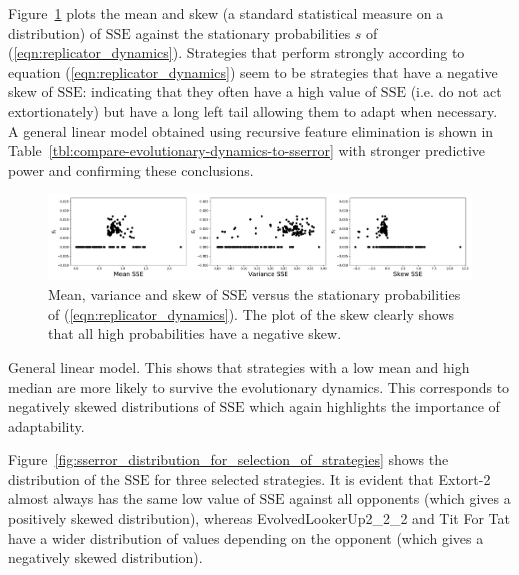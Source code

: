 \documentclass[a4paper]{article}
\newcommand{\SSe}{\text{SSE}}
\begin{document}
Figure~\ref{fig:compare-evolutionary-dynamics-to-sserror} plots the mean and
skew (a standard statistical measure on a distribution) of \(\SSe\) against the
stationary probabilities \(s\) of (\ref{eqn:replicator_dynamics}). Strategies
that perform strongly according to equation (\ref{eqn:replicator_dynamics}) seem
to be strategies that have a negative skew of \(\SSe\): indicating that they
often have a high value of \(\SSe\) (i.e. do not act extortionately) but have a
long left tail allowing them to adapt when necessary. A general linear model
obtained using recursive feature elimination is shown in
Table~\ref{tbl:compare-evolutionary-dynamics-to-sserror} with stronger
predictive power and confirming these conclusions.

\begin{figure}[!hbtp]
    \centering
    \includegraphics[width=\textwidth]{./assets/img/compare-evolutionary-dynamics-to-sserror/main.pdf}
    \caption{Mean, variance and skew of \(\SSe\) versus the stationary
    probabilities of (\ref{eqn:replicator_dynamics}). The plot of the skew
    clearly shows that all high probabilities have a negative skew.}
    \label{fig:compare-evolutionary-dynamics-to-sserror}
\end{figure}

\begin{table}[!hbtp]
    \begin{center}
    \tiny
    
    \end{center}
    \caption{General linear model. This shows that strategies with a low mean
    and high median are more likely to survive the evolutionary dynamics. This
    corresponds to negatively skewed distributions of \(\SSe\) which again
    highlights the importance of adaptability.}
    \label{tbl:compare-evolutionary-dynamics-to-sserror}
\end{table}

Figure~\ref{fig:sserror_distribution_for_selection_of_strategies} shows the
distribution of the \(\SSe\) for three selected strategies. It is evident that
Extort-2 almost always has the same low value of \(\SSe\) against all opponents
(which gives a positively skewed distribution), whereas EvolvedLookerUp2\_2\_2
and Tit For Tat have a wider distribution of values depending on the opponent
(which gives a negatively skewed distribution).
\end{document}
